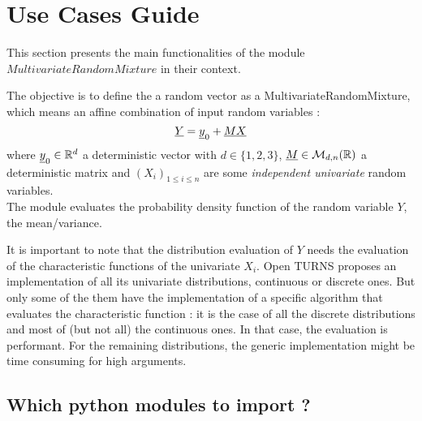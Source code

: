 



\section{Use Cases Guide}

This section presents the main functionalities of the module $MultivariateRandomMixture$ in their context.


The objective is to define the a random vector as a MultivariateRandomMixture, which means an affine combination of input random variables :
$$
\displaystyle   {\underline{Y}}={\underline{y}}_0+{\underline{M}}{\underline{X}}
$$
where ${\underline{y}}_0\in\mathbb{R}^d$ a deterministic vector with  $d\in\{1,2,3\}$, ${\underline{M}}\in\mathcal{M}_{d,n}(\mathbb{R})$ a deterministic matrix
and $(X_i)_{ 1 \leq i \leq n}$ are some  \emph{independent univariate} random variables.\\


The module evaluates the probability density function of the random variable $Y$, the mean\slash variance.

It is important to note that the distribution evaluation of $Y$ needs the evaluation of the characteristic functions of the univariate $X_i$. 
Open TURNS proposes an implementation of all its univariate distributions, continuous or discrete ones. 
But only some of the them have the implementation of a specific algorithm that evaluates the characteristic function : 
it is the case of all the discrete distributions and most of (but not all) the continuous ones. 
In that case, the evaluation is performant. 
For the remaining distributions, the generic implementation might be time consuming for high arguments. \\


\subsection{Which python modules to import ?}

